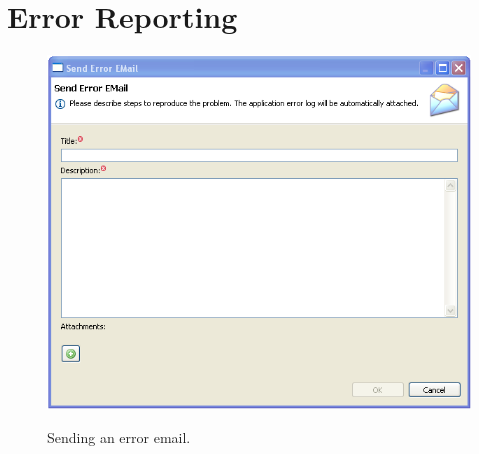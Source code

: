 \chapter{Error Reporting}
\label{chap:error_reporting}

\begin{figure}[H]
  \centering
  \scalebox{0.5}
	   { \includegraphics*{screenshots/error_reporting/send_error_email} }
	   \caption{Sending an error email.}
	   \label{fig:error_email}
\end{figure}
